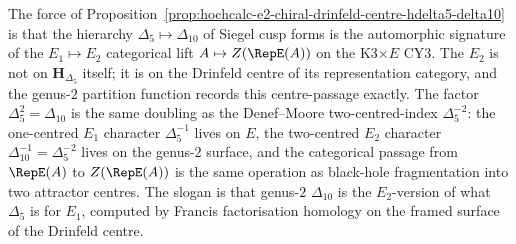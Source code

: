 \begin{remark}
\label{rem:hochcalc-e2-centre-genus2-signature}
The force of
Proposition~\ref{prop:hochcalc-e2-chiral-drinfeld-centre-hdelta5-delta10}
is that the hierarchy $\Delta_5 \mapsto \Delta_{10}$ of Siegel cusp
forms is the automorphic signature of the $E_1\mapsto E_2$ categorical
lift $A\mapsto Z(\RepE(A))$ on the K3$\times E$ CY$3$. The $E_2$ is
not on $\mathbf H_{\Delta_5}$ itself; it is on the Drinfeld centre of
its representation category, and the genus-$2$ partition function
records this centre-passage exactly. The factor $\Delta_5^2=\Delta_{10}$
is the same doubling as the Denef--Moore two-centred-index
$\Delta_5^{-2}$: the one-centred $E_1$ character $\Delta_5^{-1}$ lives
on $E$, the two-centred $E_2$ character $\Delta_{10}^{-1}=\Delta_5^{-2}$
lives on the genus-$2$ surface, and the categorical passage from
$\RepE(A)$ to $Z(\RepE(A))$ is the same operation as
black-hole fragmentation into two attractor centres. The slogan is
that genus-$2$ $\Delta_{10}$ is the $E_2$-version of what $\Delta_5$ is
for $E_1$, computed by Francis factorisation homology on the framed
surface of the Drinfeld centre.
\end{remark}

